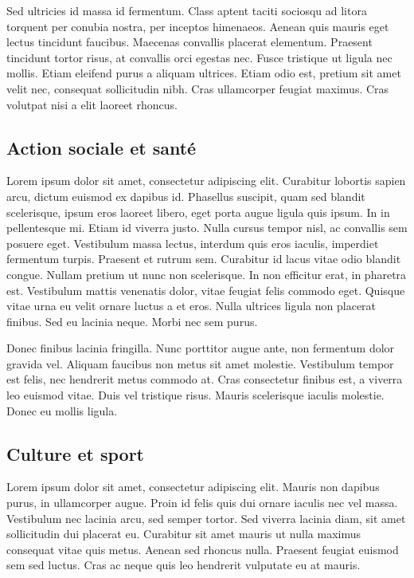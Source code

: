 \documentclass{report}
\begin{document}
Sed ultricies id massa id fermentum. Class aptent taciti sociosqu ad litora torquent per conubia nostra, per inceptos himenaeos. Aenean quis mauris eget lectus tincidunt faucibus. Maecenas convallis placerat elementum. Praesent tincidunt tortor risus, at convallis orci egestas nec. Fusce tristique ut ligula nec mollis. Etiam eleifend purus a aliquam ultrices. Etiam odio est, pretium sit amet velit nec, consequat sollicitudin nibh. Cras ullamcorper feugiat maximus. Cras volutpat nisi a elit laoreet rhoncus.

\subsection{Action sociale et santé}

Lorem ipsum dolor sit amet, consectetur adipiscing elit. Curabitur lobortis sapien arcu, dictum euismod ex dapibus id. Phasellus suscipit, quam sed blandit scelerisque, ipsum eros laoreet libero, eget porta augue ligula quis ipsum. In in pellentesque mi. Etiam id viverra justo. Nulla cursus tempor nisl, ac convallis sem posuere eget. Vestibulum massa lectus, interdum quis eros iaculis, imperdiet fermentum turpis. Praesent et rutrum sem. Curabitur id lacus vitae odio blandit congue. Nullam pretium ut nunc non scelerisque. In non efficitur erat, in pharetra est. Vestibulum mattis venenatis dolor, vitae feugiat felis commodo eget. Quisque vitae urna eu velit ornare luctus a et eros. Nulla ultrices ligula non placerat finibus. Sed eu lacinia neque. Morbi nec sem purus.

Donec finibus lacinia fringilla. Nunc porttitor augue ante, non fermentum dolor gravida vel. Aliquam faucibus non metus sit amet molestie. Vestibulum tempor est felis, nec hendrerit metus commodo at. Cras consectetur finibus est, a viverra leo euismod vitae. Duis vel tristique risus. Mauris scelerisque iaculis molestie. Donec eu mollis ligula.

\subsection{Culture et sport}

Lorem ipsum dolor sit amet, consectetur adipiscing elit. Mauris non dapibus purus, in ullamcorper augue. Proin id felis quis dui ornare iaculis nec vel massa. Vestibulum nec lacinia arcu, sed semper tortor. Sed viverra lacinia diam, sit amet sollicitudin dui placerat eu. Curabitur sit amet mauris ut nulla maximus consequat vitae quis metus. Aenean sed rhoncus nulla. Praesent feugiat euismod sem sed luctus. Cras ac neque quis leo hendrerit vulputate eu at mauris.
\end{document}
